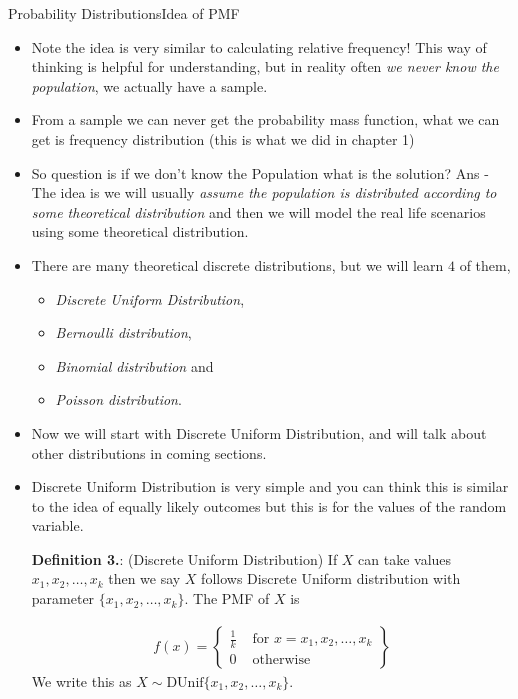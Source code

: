 \documentclass[8pt, usepdftitle=false]{beamer}
\newcounter{mytheorem}
\renewcommand{\themytheorem}{3.\arabic{mytheorem}}
\newcommand{\Thm}[1]{\refstepcounter{mytheorem}\textbf{#1\color{blue}\themytheorem}:}
\begin{document}
\begin{frame}[allowframebreaks]{Probability Distributions}{Idea of PMF}
\begin{itemize}
\item Note the idea is very similar to calculating relative frequency! This way of thinking is helpful for understanding, but in reality often \emph{we never know the population}, we actually have a sample.

\item From a sample we can never get the probability mass function, what we can get is frequency distribution (this is what we did in chapter 1) 

\item So question is if we don't know the Population what is the solution? Ans - The idea is we will usually \emph{assume the population is distributed according to some theoretical distribution} and then we will model the real life scenarios using some theoretical distribution.

\framebreak

\item There are many theoretical discrete distributions, but we will learn $4$ of them, 

\begin{itemize}
	\item \emph{Discrete Uniform Distribution}, 
	\item \emph{Bernoulli distribution}, 
	\item \emph{Binomial distribution} and 
	\item \emph{Poisson distribution}.
\end{itemize}

\item Now we will start with \alert{Discrete Uniform Distribution}, and will talk about other distributions in coming sections.

\framebreak


\item \alert{Discrete Uniform Distribution} is very simple and you can think this is similar to the idea of equally likely outcomes but this is for the values of the random variable.


\begin{varblock}{\Thm{Definition } (Discrete Uniform Distribution)}
If $X$ can take values $ x_1, x_2, \ldots, x_k$ then we say $X$ follows \alert{Discrete Uniform} distribution with parameter $\{x_1, x_2, \ldots, x_k\}$. The PMF of $X$ is

\begin{align*}
f(x) = \left\{\begin{array}{ll}
\frac{1}{k} & \text { for } x=x_1,x_2, \ldots, x_k \\
0 & \text { otherwise }
\end{array}\right\}
\end{align*}
We write this as $X \sim \mathrm{DUnif}\{x_1, x_2, \ldots, x_k\}$.
\end{varblock}


\end{itemize}
\end{frame}
\end{document}
